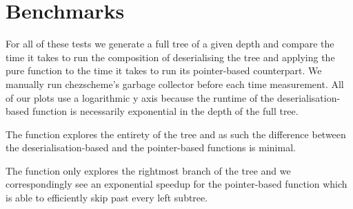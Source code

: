 


\section{Benchmarks}

For all of these tests we generate a full tree of a given depth and compare
the time it takes to run the composition of deserialising the tree and applying the pure function
to the time it takes to run its pointer-based counterpart.
%
We manually run chezscheme's garbage collector before each time measurement.
%
All of our plots use a logarithmic y axis because the runtime of the
deserialisation-based function is necessarily exponential in the depth
of the full tree.



The  function explores the entirety of the tree and as such the difference
between the deserialisation-based and the pointer-based functions is minimal.



The  function only explores the rightmost branch of
the tree and we correspondingly see an exponential speedup for the pointer-based
function which is able to efficiently skip past every left subtree.

